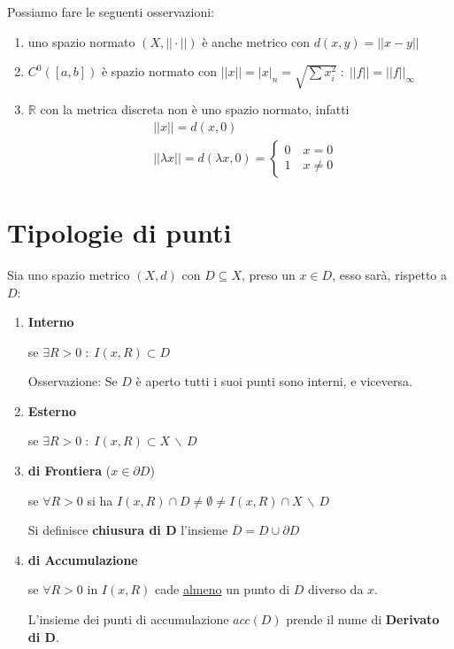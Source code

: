 Possiamo fare le seguenti osservazioni:

\begin{enumerate}
	\item uno spazio normato $(X, ||\cdot||)$ è anche metrico con $d(x,y)= ||x-y||$
	\item $C^0([a,b])$ è spazio normato con $||x||= |x|_n = \sqrt{\sum x_i^2} \; : \; ||f||=||f||_\infty$
	\item $\mathbb{R}$ con la metrica discreta non è uno spazio normato, infatti 
	\begin{align}
	{}&||x||= d(x,0) \\
	&||\lambda x||= d(\lambda x, 0) = \left\{
	\begin{array}{cc}
	0 \quad x=0 \\
	1 \quad x\neq 0
	\end{array}
	\right.
	\end{align}
\end{enumerate}

\section{Tipologie di punti}

Sia uno spazio metrico $(X,d)$ con $D \subseteq X$, preso un $x \in D$, esso sarà, rispetto a $D$:

\begin{enumerate}
	\item \textbf{Interno}
	
		se  $\exists R >0 \; : \; I(x,R)\subset D$
		
		Osservazione: Se $D$ è aperto tutti i suoi punti sono interni, e viceversa.
	\item \textbf{Esterno}
	
		se  $\exists R >0 \; : \; I(x,R)\subset X \, \backslash \,D$
	\item \textbf{di Frontiera} ($x \in \partial D$)
	
		se $\forall R>0$ si ha $I(x,R)\cap D \neq \emptyset \neq I(x,R)\cap  X \, \backslash \,D$
		
		Si definisce \textbf{chiusura di D} l'insieme $\overline{D}= D \cup \partial D$
		
	\item \textbf{di Accumulazione}
	
		se $\forall R>0$ in $I(x,R)$ cade \underline{almeno} un punto di $D$ diverso da $x$.
		
		L'insieme dei punti di accumulazione $acc(D)$ prende il nume di \textbf{Derivato di D}.
\end{enumerate}

